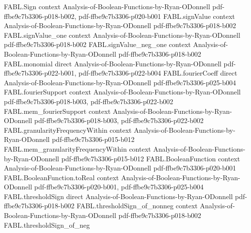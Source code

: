 \begin{theorem}
\label{FABL.hasEqualSingletonFourierCoefficients_majority}
\leanok
{}
\proofstep
  {FABL.Sign}
  {context}
  {Analysis-of-Boolean-Functions-by-Ryan-ODonnell}
  {pdf-ffbe9c7b3306-p018-b002,
    pdf-ffbe9c7b3306-p020-b001}
\proofstep
  {FABL.signValue}
  {context}
  {Analysis-of-Boolean-Functions-by-Ryan-ODonnell}
  {pdf-ffbe9c7b3306-p018-b002}
\proofstep
  {FABL.signValue_one}
  {context}
  {Analysis-of-Boolean-Functions-by-Ryan-ODonnell}
  {pdf-ffbe9c7b3306-p018-b002}
\proofstep
  {FABL.signValue_neg_one}
  {context}
  {Analysis-of-Boolean-Functions-by-Ryan-ODonnell}
  {pdf-ffbe9c7b3306-p018-b002}
\proofstep
  {FABL.monomial}
  {direct}
  {Analysis-of-Boolean-Functions-by-Ryan-ODonnell}
  {pdf-ffbe9c7b3306-p022-b001,
    pdf-ffbe9c7b3306-p022-b004}
\proofstep
  {FABL.fourierCoeff}
  {direct}
  {Analysis-of-Boolean-Functions-by-Ryan-ODonnell}
  {pdf-ffbe9c7b3306-p025-b004}
\proofstep
  {FABL.fourierSupport}
  {context}
  {Analysis-of-Boolean-Functions-by-Ryan-ODonnell}
  {pdf-ffbe9c7b3306-p018-b003,
    pdf-ffbe9c7b3306-p022-b002}
\proofstep
  {FABL.mem_fourierSupport}
  {context}
  {Analysis-of-Boolean-Functions-by-Ryan-ODonnell}
  {pdf-ffbe9c7b3306-p018-b003,
    pdf-ffbe9c7b3306-p022-b002}
\proofstep
  {FABL.granularityFrequencyWithin}
  {context}
  {Analysis-of-Boolean-Functions-by-Ryan-ODonnell}
  {pdf-ffbe9c7b3306-p015-b012}
\proofstep
  {FABL.mem_granularityFrequencyWithin}
  {context}
  {Analysis-of-Boolean-Functions-by-Ryan-ODonnell}
  {pdf-ffbe9c7b3306-p015-b012}
\proofstep
  {FABL.BooleanFunction}
  {context}
  {Analysis-of-Boolean-Functions-by-Ryan-ODonnell}
  {pdf-ffbe9c7b3306-p020-b001}
\proofstep
  {FABL.BooleanFunction.toReal}
  {context}
  {Analysis-of-Boolean-Functions-by-Ryan-ODonnell}
  {pdf-ffbe9c7b3306-p020-b001,
    pdf-ffbe9c7b3306-p025-b004}
\proofstep
  {FABL.thresholdSign}
  {direct}
  {Analysis-of-Boolean-Functions-by-Ryan-ODonnell}
  {pdf-ffbe9c7b3306-p018-b002}
\proofstep
  {FABL.thresholdSign_of_nonneg}
  {context}
  {Analysis-of-Boolean-Functions-by-Ryan-ODonnell}
  {pdf-ffbe9c7b3306-p018-b002}
\proofstep
  {FABL.thresholdSign_of_neg}

\end{theorem}

